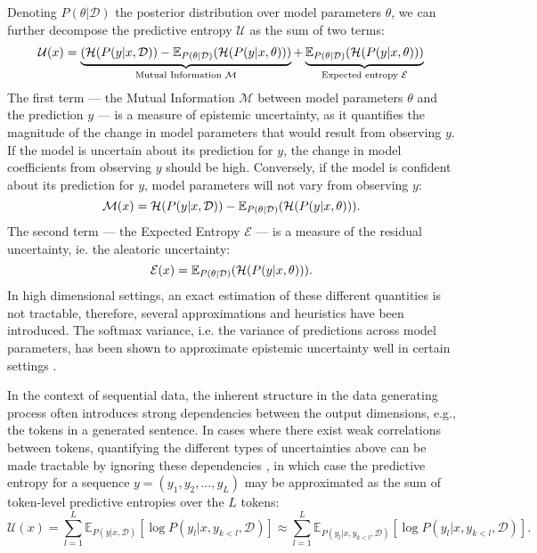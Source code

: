 Denoting $P(\theta|\mathcal{D})$ the posterior distribution over model parameters $\theta$, we can further decompose the predictive entropy $\mathcal{U}$ as the sum of two terms:
\begin{align}
\mathcal{U}(x) = \underbrace{(\mathcal{H}(P(y|x,\mathcal{D})) - \operatorname{\mathbb{E}}_{P(\theta|\mathcal{D})}(\mathcal{H}(P(y|x,\theta)))}_\text{Mutual Information $\mathcal{M}$} +   \underbrace{\operatorname{\mathbb{E}}_{P(\theta|\mathcal{D})}(\mathcal{H}(P(y|x,\theta)))}_\text{Expected entropy $\mathcal{E}$}
\end{align}
The first term --- the Mutual Information $\mathcal{M}$ between model parameters $\theta$ and the prediction $y$ --- is a measure of epistemic uncertainty, as it quantifies the magnitude of the change in model parameters that would result from observing $y$. If the model is uncertain about its prediction for $y$, the change in model coefficients from observing $y$ should be high. Conversely, if the model is confident about its prediction for $y$, model parameters will not vary from observing $y$:
\begin{equation}
\label{Sec2_MI_equation}
\mathcal{M}(x) = \mathcal{H}(P(y|x,\mathcal{D})) - \operatorname{\mathbb{E}}_{P(\theta|\mathcal{D})}(\mathcal{H}(P(y|x,\theta))).
\end{equation}
The second term --- the Expected Entropy $\mathcal{E}$ --- is a measure of the residual uncertainty, ie. the aleatoric uncertainty:
\begin{equation}
\mathcal{E}(x) = \operatorname{\mathbb{E}}_{P(\theta|\mathcal{D})}(\mathcal{H}(P(y|x,\theta))).
\end{equation}
In high dimensional settings, an exact estimation of these different quantities is not tractable, therefore, several approximations and heuristics have been introduced.
The softmax variance, i.e. the variance of predictions across model parameters, has been shown to approximate epistemic uncertainty well in certain settings \citep{carlini2016evaluating, feinman2017detecting,smith2018understanding}. 

In the context of sequential data, the inherent structure in the data generating process often introduces strong dependencies between the output dimensions, e.g., the tokens in a generated sentence. In cases where there exist weak correlations between tokens, quantifying the different types of uncertainties above can be made tractable by ignoring these dependencies \citep{malinin2020uncertainty}, in which case the predictive entropy for a sequence $y = (y_1, y_2, ..., y_L)$ may be approximated as the sum of token-level predictive entropies over the $L$ tokens:
\begin{equation} 
\mathcal{U}(x)
= \sum_{l=1}^L \mathbb{E}_{P(y|x,\mathcal{D})}[\log P(y_l|x,y_{k<l},\mathcal{D})]  \approx \sum_{l=1}^L \mathbb{E}_{P(y_l|x,y_{k<l},\mathcal{D})}[\log P(y_l|x,y_{k<l},\mathcal{D})] .
\label{Sec2_Equation_Token_level_MI}
\end{equation}

